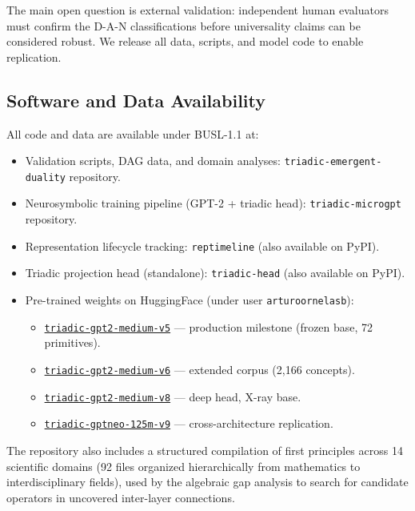 \documentclass[11pt, a4paper]{article}
\begin{document}
The main open question is external validation: independent human evaluators must confirm the D-A-N classifications before universality claims can be considered robust. We release all data, scripts, and model code to enable replication.

\subsection*{Software and Data Availability}

All code and data are available under BUSL-1.1 at:
\begin{itemize}[nosep, leftmargin=*]
    \item Validation scripts, DAG data, and domain analyses: \texttt{triadic-emergent-duality} repository.
    \item Neurosymbolic training pipeline (GPT-2 + triadic head): \texttt{triadic-microgpt} repository.
    \item Representation lifecycle tracking: \texttt{reptimeline} (also available on PyPI).
    \item Triadic projection head (standalone): \texttt{triadic-head} (also available on PyPI).
    \item Pre-trained weights on HuggingFace (under user \texttt{arturoornelasb}):
    \begin{itemize}[nosep, leftmargin=*]
        \item \href{https://huggingface.co/arturoornelasb/triadic-gpt2-medium-v5}{\texttt{triadic-gpt2-medium-v5}} --- production milestone (frozen base, 72 primitives).
        \item \href{https://huggingface.co/arturoornelasb/triadic-gpt2-medium-v6}{\texttt{triadic-gpt2-medium-v6}} --- extended corpus (2{,}166 concepts).
        \item \href{https://huggingface.co/arturoornelasb/triadic-gpt2-medium-v8}{\texttt{triadic-gpt2-medium-v8}} --- deep head, X-ray base.
        \item \href{https://huggingface.co/arturoornelasb/triadic-gptneo-125m-v9}{\texttt{triadic-gptneo-125m-v9}} --- cross-architecture replication.
    \end{itemize}
\end{itemize}
The repository also includes a structured compilation of first principles across 14 scientific domains (92 files organized hierarchically from mathematics to interdisciplinary fields), used by the algebraic gap analysis to search for candidate operators in uncovered inter-layer connections.
\end{document}
